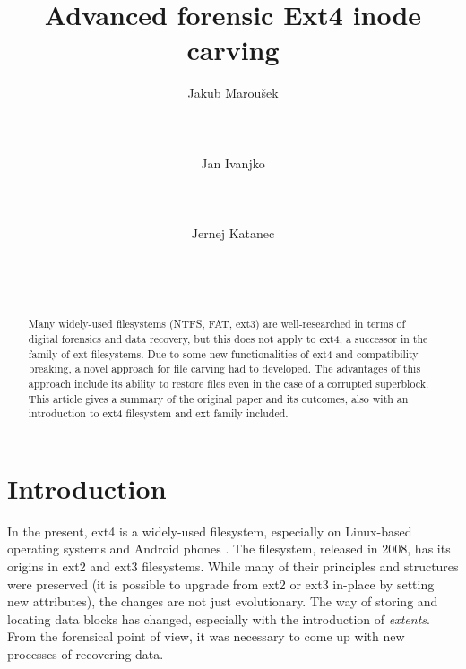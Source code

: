 \documentclass{acm_proc_article-sp}
\begin{document}
\title{Advanced forensic Ext4 inode carving}

\author{
\alignauthor Jakub Marou\v sek \\
	\\
    \\
    \\
\alignauthor Jan Ivanjko \\
	\\
    \\
    \\
\alignauthor Jernej Katanec \\
	\\
    \\
    \\
}

\maketitle
\begin{abstract}
Many widely-used filesystems (NTFS, FAT, ext3) are well-researched in terms of digital forensics and data recovery, but this does not apply to ext4, a successor in the family of ext filesystems. Due to some new functionalities of ext4 and compatibility breaking, a novel approach for file carving had to developed. The advantages of this approach include its ability to restore files even in the case of a corrupted superblock. This article gives a summary of the original paper and its outcomes, also with an introduction to ext4 filesystem and ext family included.
\end{abstract}

\section{Introduction}

In the present, ext4 is a widely-used filesystem, especially on Linux-based operating systems and Android phones \cite{afeic}. The filesystem, released in 2008, has its origins in ext2 and ext3 filesystems. While many of their principles and structures were preserved (it is possible to upgrade from ext2 or ext3 in-place by setting new attributes), the changes are not just evolutionary. The way of storing and locating data blocks has changed, especially with the introduction of {\it extents}. From the forensical point of view, it was necessary to come up with new processes of recovering data.
\end{document}
